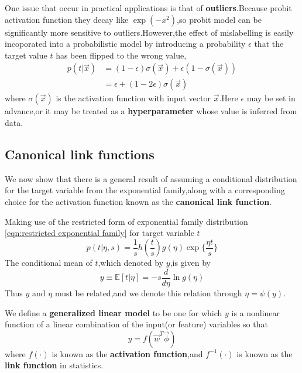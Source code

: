 One issue that occur in practical applications is that of \textbf{outliers}.Because probit activation function they decay like $\exp(-x^2)$,so probit model can be significantly more sensitive to outliers.However,the effect of mislabelling is easily incoporated into a probabilistic model by introducing a probability $\epsilon$ that the target value $t$ has been flipped to the wrong value,
\begin{align}
p(t|\vec{x}) &= (1-\epsilon)\sigma(\vec{x})+\epsilon(1-\sigma(\vec{x}))\\
&=\epsilon + (1-2\epsilon)\sigma(\vec{x})
\end{align}
where $\sigma(\vec{x})$ is the activation function with input vector $\vec{x}$.Here $\epsilon$ may be set in advance,or it may be treated as a \textbf{hyperparameter} whose value is inferred from data.




\subsection{Canonical link functions}
We now show that there is a general result of assuming a conditional distribution for the target variable from the exponential family,along with a corresponding choice for the activation function known as the \textbf{canonical link function}.

Making use of the restricted form of exponential family distribution \ref{eqn:restricted exponential family} for target variable $t$
\begin{equation}
p(t|\eta,s)=\dfrac{1}{s}h(\dfrac{t}{s})g(\eta)\exp\{\dfrac{\eta t}{s}\}
\end{equation}
The conditional mean of $t$,which denoted by $y$,is given by 
\begin{equation}
y \equiv \mathbb{E}[t|\eta]=-s\dfrac{d}{d\eta}\ln g(\eta)
\end{equation}
Thus $y$ and $\eta$ must be related,and we denote this relation through $\eta = \psi(y)$.

We define a \textbf{generalized linear model} to be one for which $y$ is a nonlinear function of a linear combination of the input(or feature) variables so that
\begin{equation}
y=f(\vec{w}^T\vec{\phi})
\end{equation}
where $f(\cdot)$ is known as the \textbf{activation function},and $f^{-1}(\cdot)$ is known as the \textbf{link function} in statistics.

